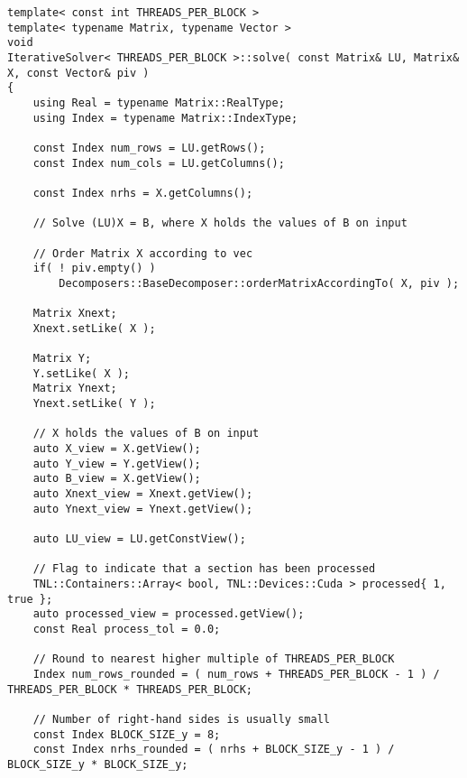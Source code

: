 \begin{lstlisting}[caption={Excerpt from the implementation of IS\_\textit{x}PP.
The code has been slightly modified for brevity, for example, the checks for appropriate sizing of matrices and vectors have been removed.
Note that the CUDA thread blocks used in the implementation are larger in the 1st dimension.
Threads adjacent in the 1st dimension are assigned to neighboring elements in the same column since the matrices are stored in column-major order on the GPU.
In other words, to mitigate misaligned global memory access, the 1st dimension of threads is used to access elements in a single column and the 2nd dimension is used to differentiate between right-hand sides.},label={Listing:ISxPP-implementation-excerpt},escapechar=@]
template< const int THREADS_PER_BLOCK >
template< typename Matrix, typename Vector >
void
IterativeSolver< THREADS_PER_BLOCK >::solve( const Matrix& LU, Matrix& X, const Vector& piv )
{
	using Real = typename Matrix::RealType;
	using Index = typename Matrix::IndexType;
	
	const Index num_rows = LU.getRows();
	const Index num_cols = LU.getColumns();
	
	const Index nrhs = X.getColumns();
	
	// Solve (LU)X = B, where X holds the values of B on input
	
	// Order Matrix X according to vec
	if( ! piv.empty() )
		Decomposers::BaseDecomposer::orderMatrixAccordingTo( X, piv );
	
	Matrix Xnext;
	Xnext.setLike( X );
	
	Matrix Y;
	Y.setLike( X );
	Matrix Ynext;
	Ynext.setLike( Y );
	
	// X holds the values of B on input
	auto X_view = X.getView();
	auto Y_view = Y.getView();
	auto B_view = X.getView();
	auto Xnext_view = Xnext.getView();
	auto Ynext_view = Ynext.getView();
	
	auto LU_view = LU.getConstView();
	
	// Flag to indicate that a section has been processed
	TNL::Containers::Array< bool, TNL::Devices::Cuda > processed{ 1, true };
	auto processed_view = processed.getView();
	const Real process_tol = 0.0;
	
	// Round to nearest higher multiple of THREADS_PER_BLOCK
	Index num_rows_rounded = ( num_rows + THREADS_PER_BLOCK - 1 ) / THREADS_PER_BLOCK * THREADS_PER_BLOCK;
	
	// Number of right-hand sides is usually small
	const Index BLOCK_SIZE_y = 8;
	const Index nrhs_rounded = ( nrhs + BLOCK_SIZE_y - 1 ) / BLOCK_SIZE_y * BLOCK_SIZE_y;
	

\end{lstlisting}
